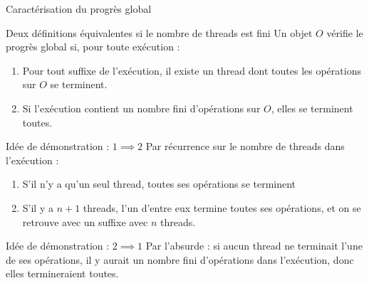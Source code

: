 
\begingroup

\begin{frame}{Caractérisation du progrès global}

  \begin{block}{Deux définitions équivalentes si le nombre de threads est fini}
    Un objet $O$ vérifie le progrès global si, pour toute exécution :
    \begin{enumerate}
    \item Pour tout suffixe de l'exécution, il existe un thread dont toutes les opérations sur $O$ se terminent.
    \item Si l'exécution contient un nombre fini d'opérations sur $O$, elles se terminent toutes.
    \end{enumerate}
  \end{block}

  \begin{exampleblock}{Idée de démonstration : $1 \implies 2$}
    Par récurrence sur le nombre de threads dans l'exécution :
    \begin{enumerate}
    \item S'il n'y a qu'un seul thread, toutes ses opérations se terminent
    \item S'il y a $n+1$ threads, l'un d'entre eux termine toutes ses opérations,
      et on se retrouve avec un suffixe avec $n$ threads. 
    \end{enumerate}
  \end{exampleblock}

  \begin{exampleblock}{Idée de démonstration : $2 \implies 1$}
    Par l'absurde : si aucun thread ne terminait l'une de ses opérations, il y aurait un nombre fini d'opérations dans l'exécution, donc elles termineraient toutes. 
  \end{exampleblock}

\end{frame}

\endgroup
\endinput

